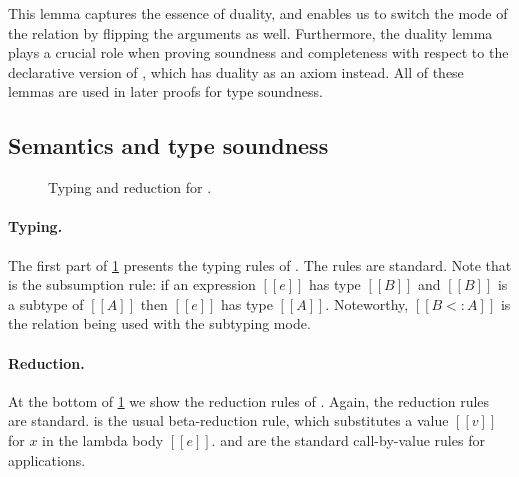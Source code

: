This lemma captures the essence of duality,
and enables us to switch the mode of the relation by flipping the arguments as well.
Furthermore, the duality lemma plays a crucial role when proving soundness and
completeness with respect to the declarative version of \nameduo, which has duality
as an axiom instead.
All of these lemmas are used in later proofs for type soundness.


\subsection{Semantics and type soundness}
\label{sec:algorithm:2}




\begin{figure}[t]
   \begin{small}
    \centering
   \end{small}
   
   \begin{small}
    \centering
  \end{small}
  \caption{Typing and reduction for \ui.}
  \label{fig:typing}
\end{figure}




\paragraph{Typing.}
The first part of \cref{fig:typing} presents the typing rules of \ui.
The rules are standard. Note that  is the subsumption
rule: if an expression $[[e]]$ has type $[[B]]$ and $[[B]]$ is a subtype of $[[A]]$
then $[[e]]$ has type $[[A]]$. Noteworthy, $[[B <: A]]$ is the \nameduo
relation being used with the subtyping mode. 

\paragraph{Reduction.}
At the bottom of \cref{fig:typing} we show the reduction rules of
\ui.  Again, the reduction rules are standard.   is
the usual beta-reduction rule, which substitutes a value $[[v]]$ for
$x$ in the lambda body $[[e]]$.   and 
are the standard call-by-value rules for applications.


